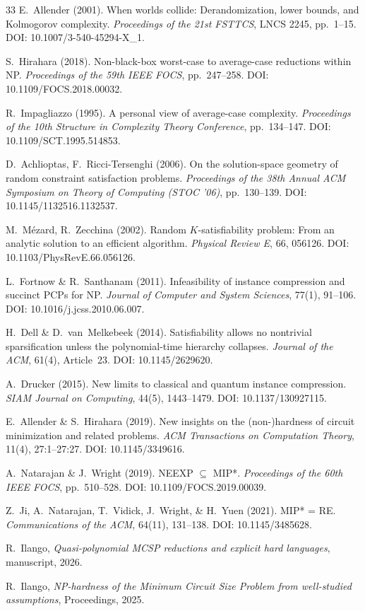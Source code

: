 \documentclass[aps,prd,twocolumn,superscriptaddress,nofootinbib]{revtex4-2}
\theoremstyle{definition}
\theoremstyle{remark}
\begin{document}
\begin{thebibliography}{33}
E.~Allender (2001).
When worlds collide: Derandomization, lower bounds, and Kolmogorov complexity.
\textit{Proceedings of the 21st FSTTCS}, LNCS 2245, pp.\ 1--15.
DOI: 10.1007/3-540-45294-X\_1.

S.~Hirahara (2018).
Non-black-box worst-case to average-case reductions within NP.
\textit{Proceedings of the 59th IEEE FOCS}, pp.\ 247--258.
DOI: 10.1109/FOCS.2018.00032.

R.~Impagliazzo (1995).
A personal view of average-case complexity.
\textit{Proceedings of the 10th Structure in Complexity Theory Conference}, pp.\ 134--147.
DOI: 10.1109/SCT.1995.514853.

D.~Achlioptas, F.~Ricci-Tersenghi (2006).
On the solution-space geometry of random constraint satisfaction problems.
\textit{Proceedings of the 38th Annual ACM Symposium on Theory of Computing (STOC '06)}, pp.\ 130--139.
DOI: 10.1145/1132516.1132537.

M.~M\'ezard, R.~Zecchina (2002).
Random $K$-satisfiability problem: From an analytic solution to an efficient algorithm.
\textit{Physical Review E}, 66, 056126.
DOI: 10.1103/PhysRevE.66.056126.

L.~Fortnow \& R.~Santhanam (2011).
Infeasibility of instance compression and succinct PCPs for NP.
\textit{Journal of Computer and System Sciences}, 77(1), 91--106.
DOI: 10.1016/j.jcss.2010.06.007.

H.~Dell \& D.~van~Melkebeek (2014).
Satisfiability allows no nontrivial sparsification unless the polynomial-time hierarchy collapses.
\textit{Journal of the ACM}, 61(4), Article~23.
DOI: 10.1145/2629620.

A.~Drucker (2015).
New limits to classical and quantum instance compression.
\textit{SIAM Journal on Computing}, 44(5), 1443--1479.
DOI: 10.1137/130927115.

E.~Allender \& S.~Hirahara (2019).
New insights on the (non-)hardness of circuit minimization and related problems.
\textit{ACM Transactions on Computation Theory}, 11(4), 27:1--27:27.
DOI: 10.1145/3349616.

A.~Natarajan \& J.~Wright (2019).
NEEXP $\subseteq$ MIP*.
\textit{Proceedings of the 60th IEEE FOCS}, pp.\ 510--528.
DOI: 10.1109/FOCS.2019.00039.

Z.~Ji, A.~Natarajan, T.~Vidick, J.~Wright, \& H.~Yuen (2021).
MIP* = RE.
\textit{Communications of the ACM}, 64(11), 131--138.
DOI: 10.1145/3485628.

R.~Ilango, \textit{Quasi-polynomial MCSP reductions and explicit hard languages}, manuscript, 2026.

 R.~Ilango, \textit{NP-hardness of the Minimum Circuit Size Problem from well-studied assumptions}, Proceedings, 2025.

\end{thebibliography}
\end{document}
